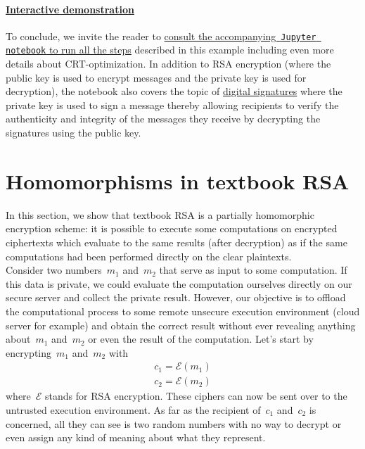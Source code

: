 \documentclass{article}
\begin{document}
\paragraph{\href{https://github.com/Ranlot/public-key-encryption}{Interactive demonstration}} To conclude, we invite the reader to \href{https://github.com/Ranlot/public-key-encryption}{consult the accompanying~\texttt{Jupyter notebook} to run all the steps} described in this example including even more details about CRT-optimization.  In addition to RSA encryption (where the public key is used to encrypt messages and the private key is used for decryption), the notebook also covers the topic of \href{https://en.wikipedia.org/wiki/Digital_signature}{digital signatures} where the private key is used to sign a message thereby allowing recipients to verify the authenticity and integrity of the messages they receive by decrypting the signatures using the public key.

\section{Homomorphisms in textbook RSA}
\label{sec::homomorphisms}

In this section, we show that textbook RSA is a partially homomorphic encryption scheme: it is possible to execute some computations on encrypted ciphertexts which evaluate to the same results (after decryption) as if the same computations had been performed directly on the clear plaintexts.  \\

\noindent Consider two numbers~$m_1$ and~$m_2$ that serve as input to some computation.  If this data is private, we could evaluate the computation ourselves directly on our secure server and collect the private result.  However, our objective is to offload the computational process to some remote unsecure execution environment (cloud server for example) and obtain the correct result without ever revealing anything about~$m_1$ and~$m_2$ or even the result of the computation. Let's start by encrypting~$m_1$ and~$m_2$ with
\begin{align*}
c_1 = \mathcal{E}(m_1) \\
c_2 = \mathcal{E}(m_2)
\end{align*}
where~$\mathcal{E}$ stands for RSA encryption.  These ciphers can now be sent over to the untrusted execution environment.   As far as the recipient of~$c_1$ and~$c_2$ is concerned, all they can see is two random numbers with no way to decrypt or even assign any kind of meaning about what they represent.
\end{document}
